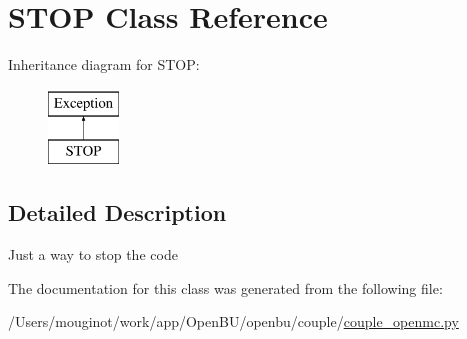 \hypertarget{classopenbu_1_1couple_1_1couple__openmc_1_1_s_t_o_p}{}\section{S\+T\+OP Class Reference}
\label{classopenbu_1_1couple_1_1couple__openmc_1_1_s_t_o_p}
Inheritance diagram for S\+T\+OP\+:\begin{figure}[H]
\begin{center}
\leavevmode
\includegraphics[height=2.000000cm]{classopenbu_1_1couple_1_1couple__openmc_1_1_s_t_o_p}
\end{center}
\end{figure}


\subsection{Detailed Description}
\begin{DoxyVerb}Just a way to stop the code\end{DoxyVerb}
 

The documentation for this class was generated from the following file\+:\begin{DoxyCompactItemize}
\item 
/\+Users/mouginot/work/app/\+Open\+B\+U/openbu/couple/\mbox{\hyperlink{couple__openmc_8py}{couple\+\_\+openmc.\+py}}\end{DoxyCompactItemize}

